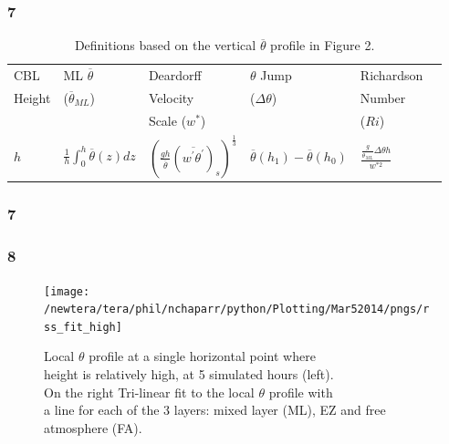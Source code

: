 \documentclass{beamer}
\newcommand\FrameText[1]{
\begin{textblock}{16}(1,2.5)
\raggedright #1
\end{textblock}}
\begin{document}
\begin{frame}
\frametitle{7}
\begin{table}[htbp]
\caption[]{Definitions based on the vertical $\overline{\theta}$ profile in Figure 2.}
    \begin{center}
    \begin{tabular}{ p{1cm} p{2cm} p{2cm}  p{2cm}  p{2cm} p{2.5cm} }
      CBL& ML $\overline{\theta}$ & Deardorff & $\theta$ Jump &Richardson\\
      Height&($\overline{\theta}_{ML}$)&Velocity&($\Delta \theta$)&Number\\
            &&Scale ($w^{*}$)&&($Ri$) \\ \hline 
       $h$  &$\frac{1}{h}\int^{h}_{0}\overline{\theta}(z)dz$ & $\left( \frac{gh}{\overline{\theta}}(\overline{w^{'}\theta^{'}})_{s} \right)^{\frac{1}{3}}$& $\overline{\theta}(h_{1})-\overline{\theta}(h_{0})$ & $\frac{\frac{g}{\overline{\theta}_{ML}}\Delta \theta h}{w^{*2}}$  \\ [.3cm] \hline
      \end{tabular}
\label{tab:reldefs}   
\end{center}    
\end{table}
\end{frame}

\begin{frame}
\frametitle{7}
 \begin{figure}[ht]
 \end{figure}
\end{frame}

\begin{frame}
\frametitle{8}
\fontsize{12pt}{7.2}\selectfont
\begin{figure}
\centering
\texttt{[image: /newtera/tera/phil/nchaparr/python/Plotting/Mar52014/pngs/rss\_fit\_high]}
\caption{Local $\theta$ profile at a single horizontal point where\\ 
height is relatively high, at 5 simulated hours (left).\\
On the right Tri-linear fit to the local $\theta$ profile with \\
a line for each of the 3 layers: mixed layer (ML), EZ and free \\
atmosphere (FA).}
\end{figure}
\end{frame}
\end{document}
